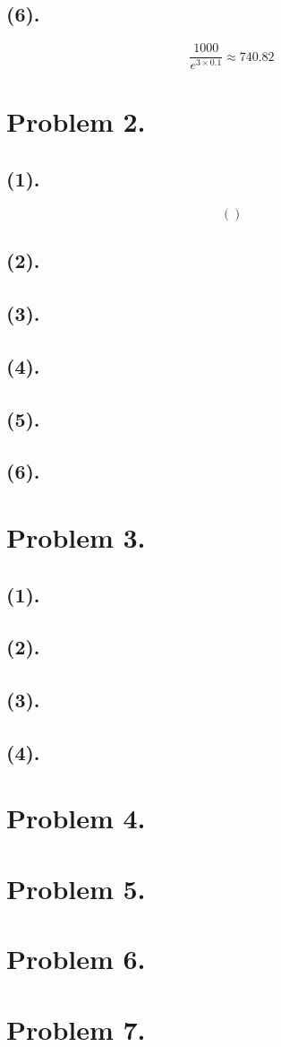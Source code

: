 \documentclass{article}
\begin{document}
\subsection{(6).}
\begin{equation}
  \frac{1000}{e^{3\times 0.1}} \approx 740.82  
\end{equation}

\section{Problem 2.}
\subsection{(1).}
\begin{equation}
  ()
\end{equation}
\subsection{(2).}
\subsection{(3).}
\subsection{(4).}
\subsection{(5).}
\subsection{(6).}
\section{Problem 3.}
\subsection{(1).}
\subsection{(2).}
\subsection{(3).}
\subsection{(4).}
\section{Problem 4.}
\section{Problem 5.}
\section{Problem 6.}
\section{Problem 7.}
\end{document}
